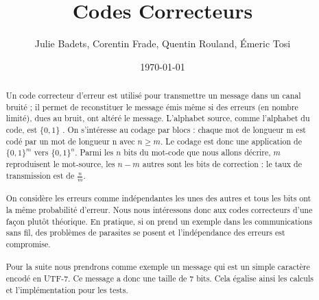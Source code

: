\documentclass[a4paper,11pt]{report}
\title{Codes Correcteurs}
\author{Julie Badets, Corentin Frade, Quentin Rouland, Émeric Tosi}
\date{\today}
\begin{document}
    \maketitle{} %


    \begin{figure}
        \begin{center}
        \end{center}
    \end{figure}


    \begin{abstract} %
        \paragraph{}
Un code correcteur d'erreur est utilisé pour transmettre un message dans un canal bruité ;
il permet de reconstituer le message émis même si des erreurs (en nombre limité), dues au bruit, ont altéré le message.
L'alphabet source, comme l'alphabet du code, est $\{0,1\}$ .
On s'intéresse au codage par blocs : chaque mot de longueur m est codé par un mot de longueur n avec $n \geq m$.
Le codage est donc une application de $\{0,1\}^m$  vers $\{0,1\}^n$.
Parmi les $n$ bits du mot-code que nous allons décrire, $m$ reproduisent le mot-source,
les $n-m$ autres sont les bits de correction : le taux de transmission est de $\frac{n}{m}$.
        \paragraph{}
On considère les erreurs comme indépendantes les unes des autres et tous les bits ont la même probabilité d'erreur.
Nous nous intéressons donc aux codes correcteurs d'une façon plutôt théorique.
En pratique, si on prend un exemple dans les communications sans fil,
des problèmes de parasites se posent et l'indépendance des erreurs est compromise.
        \paragraph{}
Pour la suite nous prendrons comme exemple un message qui est un simple caractère encodé en UTF-7.
Ce message a donc une taille de 7 bits.
Cela égalise ainsi les calculs et l'implémentation pour les tests.
    \end{abstract}
    \clearpage
\end{document}
